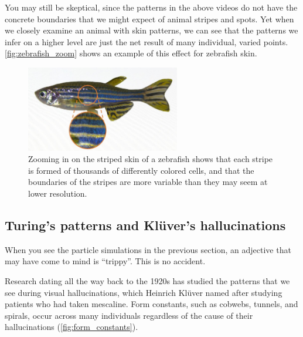 You may still be skeptical, since the patterns in the above videos do not have the concrete boundaries that we might expect of animal stripes and spots. Yet when we closely examine an animal with skin patterns, we can see that the patterns we infer on a higher level are just the net result of many individual, varied points.  \autoref{fig:zebrafish_zoom} shows an example of this effect for zebrafish skin.\\

\begin{figure}[h]
\centering
\mySfFamily
\includegraphics[width = 0.6\textwidth]{../images/zebrafish_zoom.jpg}
\caption{Zooming in on the striped skin of a zebrafish shows that each stripe is formed of thousands of differently colored cells, and that the boundaries of the stripes are more variable than they may seem at lower resolution.}
\label{fig:zebrafish_zoom}
\end{figure}

\FloatBarrier
{}
\subsection{Turing's patterns and Klüver's hallucinations}

When you see the particle simulations in the previous section, an adjective that may have come to mind is ``trippy''. This is no accident.

Research dating all the way back to the 1920s has studied the patterns that we see during visual hallucinations, which Heinrich Klüver named  after studying patients who had taken mescaline. Form constants, such as cobwebs, tunnels, and spirals, occur across many individuals regardless of the cause of their hallucinations (\autoref{fig:form_constants}).\\

